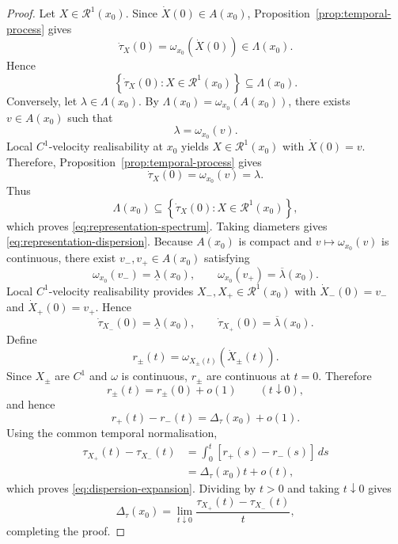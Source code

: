 \documentclass[10pt,a4paper]{amsart}
\begin{document}
\begin{proof}

Let \(X\in\mathcal R^1(x_0)\). Since
\(\dot X(0)\in A(x_0)\), Proposition~\ref{prop:temporal-process} gives
\[
\dot\tau_X(0)
=
\omega_{x_0}\!\left(\dot X(0)\right)
\in\Lambda(x_0).
\]
Hence
\[
\left\{
\dot\tau_X(0):
X\in\mathcal R^1(x_0)
\right\}
\subseteq
\Lambda(x_0).
\]
Conversely, let \(\lambda\in\Lambda(x_0)\). By
\(\Lambda(x_0)=\omega_{x_0}(A(x_0))\), there exists
\(v\in A(x_0)\) such that
\[
\lambda=\omega_{x_0}(v).
\]
Local \(C^1\)-velocity realisability at \(x_0\) yields
\(X\in\mathcal R^1(x_0)\) with \(\dot X(0)=v\). Therefore,
Proposition~\ref{prop:temporal-process} gives
\[
\dot\tau_X(0)
=
\omega_{x_0}(v)
=
\lambda.
\]
Thus
\[
\Lambda(x_0)
\subseteq
\left\{
\dot\tau_X(0):
X\in\mathcal R^1(x_0)
\right\},
\]
which proves \eqref{eq:representation-spectrum}. Taking diameters gives
\eqref{eq:representation-dispersion}. Because \(A(x_0)\) is compact and
\(v\mapsto\omega_{x_0}(v)\) is continuous, there exist
\(v_-,v_+\in A(x_0)\) satisfying
\[
\omega_{x_0}(v_-)
=
\underline\lambda(x_0),
\qquad
\omega_{x_0}(v_+)
=
\overline\lambda(x_0).
\]
Local \(C^1\)-velocity realisability provides
\(X_-,X_+\in\mathcal R^1(x_0)\) with
\(\dot X_-(0)=v_-\) and \(\dot X_+(0)=v_+\). Hence
\[
\dot\tau_{X_-}(0)
=
\underline\lambda(x_0),
\qquad
\dot\tau_{X_+}(0)
=
\overline\lambda(x_0).
\]
Define
\[
r_\pm(t)
=
\omega_{X_\pm(t)}
\!\left(\dot X_\pm(t)\right).
\]
Since \(X_\pm\) are \(C^1\) and \(\omega\) is continuous,
\(r_\pm\) are continuous at \(t=0\). Therefore
\[
r_\pm(t)=r_\pm(0)+o(1)
\qquad
(t\downarrow0),
\]
and hence
\[
r_+(t)-r_-(t)
=
\Delta_\tau(x_0)+o(1).
\]
Using the common temporal normalisation,
\[
\begin{aligned}
\tau_{X_+}(t)-\tau_{X_-}(t)
&=
\int_0^t
\left[r_+(s)-r_-(s)\right]\,ds \\
&=
\Delta_\tau(x_0)t+o(t),
\end{aligned}
\]
which proves \eqref{eq:dispersion-expansion}. Dividing by \(t>0\) and taking
\(t\downarrow0\) gives
\[
\Delta_\tau(x_0)
=
\lim_{t\downarrow0}
\frac{\tau_{X_+}(t)-\tau_{X_-}(t)}{t},
\]
completing the proof.
\end{proof}
\end{document}
